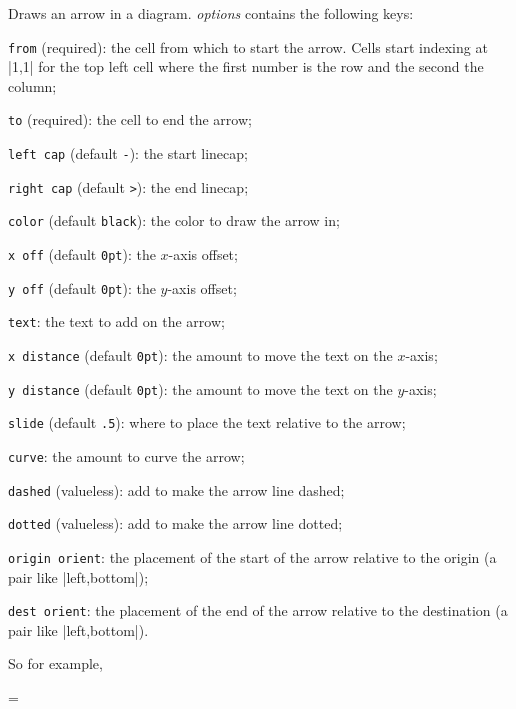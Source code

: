 Draws an arrow in a \macro\drawdiagram{} diagram.
{\it options} contains the following keys:
\blist
    \item {\tt from} (required): the cell from which to start the arrow.
        Cells start indexing at \inlinecode|{1,1}| for the top left cell where the first number is the row and the second the column;
    \item {\tt to} (required): the cell to end the arrow;
    \item {\tt left cap} (default {\tt-}): the start linecap;
    \item {\tt right cap} (default {\tt>}): the end linecap;
    \item {\tt color} (default {\tt black}): the color to draw the arrow in;
    \item {\tt x off} (default {\tt0pt}): the $x$-axis offset;
    \item {\tt y off} (default {\tt0pt}): the $y$-axis offset;
    \item {\tt text}: the text to add on the arrow;
    \item {\tt x distance} (default {\tt0pt}): the amount to move the text on the $x$-axis;
    \item {\tt y distance} (default {\tt0pt}): the amount to move the text on the $y$-axis;
    \item {\tt slide} (default {\tt.5}): where to place the text relative to the arrow;
    \item {\tt curve}: the amount to curve the arrow;
    \item {\tt dashed} (valueless): add to make the arrow line dashed;
    \item {\tt dotted} (valueless): add to make the arrow line dotted;
    \item {\tt origin orient}: the placement of the start of the arrow relative to the origin (a pair like \inlinecode|{left,bottom}|);
    \item {\tt dest orient}: the placement of the end of the arrow relative to the destination (a pair like \inlinecode|{left,bottom}|).
\elist
\emacroexp

So for example, 

\bgroup\parindent=\z@
\beginhi \color{white}
\endhi
\egroup

